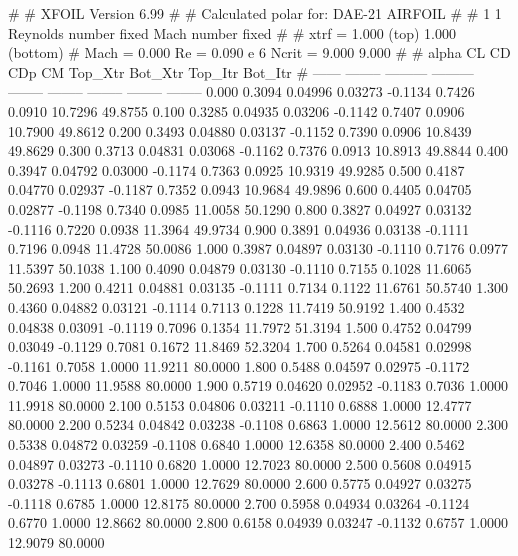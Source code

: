 #  
#       XFOIL         Version 6.99
#  
# Calculated polar for: DAE-21 AIRFOIL                                  
#  
# 1 1 Reynolds number fixed          Mach number fixed         
#  
# xtrf =   1.000 (top)        1.000 (bottom)  
# Mach =   0.000     Re =     0.090 e 6     Ncrit =   9.000  9.000
#  
#   alpha    CL        CD       CDp       CM     Top_Xtr  Bot_Xtr  Top_Itr  Bot_Itr
#  ------ -------- --------- --------- -------- -------- -------- -------- --------
   0.000   0.3094   0.04996   0.03273  -0.1134   0.7426   0.0910  10.7296  49.8755
   0.100   0.3285   0.04935   0.03206  -0.1142   0.7407   0.0906  10.7900  49.8612
   0.200   0.3493   0.04880   0.03137  -0.1152   0.7390   0.0906  10.8439  49.8629
   0.300   0.3713   0.04831   0.03068  -0.1162   0.7376   0.0913  10.8913  49.8844
   0.400   0.3947   0.04792   0.03000  -0.1174   0.7363   0.0925  10.9319  49.9285
   0.500   0.4187   0.04770   0.02937  -0.1187   0.7352   0.0943  10.9684  49.9896
   0.600   0.4405   0.04705   0.02877  -0.1198   0.7340   0.0985  11.0058  50.1290
   0.800   0.3827   0.04927   0.03132  -0.1116   0.7220   0.0938  11.3964  49.9734
   0.900   0.3891   0.04936   0.03138  -0.1111   0.7196   0.0948  11.4728  50.0086
   1.000   0.3987   0.04897   0.03130  -0.1110   0.7176   0.0977  11.5397  50.1038
   1.100   0.4090   0.04879   0.03130  -0.1110   0.7155   0.1028  11.6065  50.2693
   1.200   0.4211   0.04881   0.03135  -0.1111   0.7134   0.1122  11.6761  50.5740
   1.300   0.4360   0.04882   0.03121  -0.1114   0.7113   0.1228  11.7419  50.9192
   1.400   0.4532   0.04838   0.03091  -0.1119   0.7096   0.1354  11.7972  51.3194
   1.500   0.4752   0.04799   0.03049  -0.1129   0.7081   0.1672  11.8469  52.3204
   1.700   0.5264   0.04581   0.02998  -0.1161   0.7058   1.0000  11.9211  80.0000
   1.800   0.5488   0.04597   0.02975  -0.1172   0.7046   1.0000  11.9588  80.0000
   1.900   0.5719   0.04620   0.02952  -0.1183   0.7036   1.0000  11.9918  80.0000
   2.100   0.5153   0.04806   0.03211  -0.1110   0.6888   1.0000  12.4777  80.0000
   2.200   0.5234   0.04842   0.03238  -0.1108   0.6863   1.0000  12.5612  80.0000
   2.300   0.5338   0.04872   0.03259  -0.1108   0.6840   1.0000  12.6358  80.0000
   2.400   0.5462   0.04897   0.03273  -0.1110   0.6820   1.0000  12.7023  80.0000
   2.500   0.5608   0.04915   0.03278  -0.1113   0.6801   1.0000  12.7629  80.0000
   2.600   0.5775   0.04927   0.03275  -0.1118   0.6785   1.0000  12.8175  80.0000
   2.700   0.5958   0.04934   0.03264  -0.1124   0.6770   1.0000  12.8662  80.0000
   2.800   0.6158   0.04939   0.03247  -0.1132   0.6757   1.0000  12.9079  80.0000
